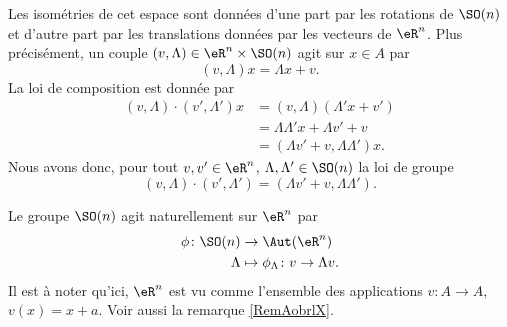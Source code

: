 Les isométries de cet espace sont données d'une part par les rotations de \( \SO(n)\) et d'autre part par les translations données par les vecteurs de \( \eR^n\). Plus précisément, un couple \( (v,\Lambda)\in \eR^n\times\SO(n)\) agit sur \( x\in A\) par
\begin{equation}
    (v,\Lambda)x=\Lambda x+v.
\end{equation}
La loi de composition est donnée par
\begin{subequations}
    \begin{align}
        (v,\Lambda)\cdot(v',\Lambda')x&=(v,\Lambda)(\Lambda'x+v')\\
        &=\Lambda\Lambda'x+\Lambda v'+v\\
        &=(\Lambda v'+v,\Lambda\Lambda')x.
    \end{align}
\end{subequations}
Nous avons donc, pour tout \( v,v'\in \eR^n\), \( \Lambda,\Lambda'\in\SO(n)\) la loi de groupe
\begin{equation}    \label{EqDiHcut}
        (v,\Lambda)\cdot(v',\Lambda')=(\Lambda v'+v,\Lambda\Lambda').
\end{equation}
    
Le groupe \( \SO(n)\) agit naturellement sur \( \eR^n\) par
\begin{equation}
    \begin{aligned}
        \phi\colon \SO(n)&\to \Aut(\eR^n) \\
        \Lambda&\mapsto \phi_{\Lambda}\colon v\to \Lambda v. 
    \end{aligned}
\end{equation}
Il est à noter qu'ici, \( \eR^n\) est vu comme l'ensemble des applications \( v\colon A\to A\), \( v(x)=x+a\). Voir aussi la remarque \ref{RemAobrlX}.

